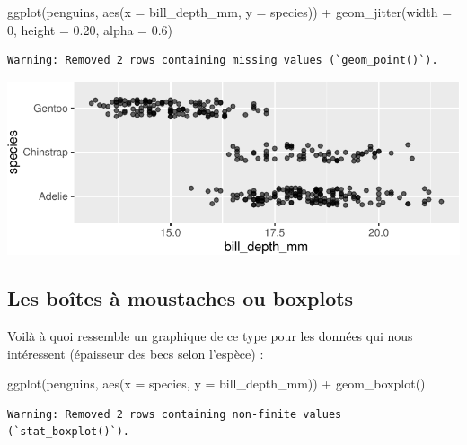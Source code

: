 \documentclass[
  a4paper,
  DIV=11,
  numbers=noendperiod,
  oneside]{scrreprt}
\newenvironment{Shaded}{}{}
\newcommand{\AttributeTok}[1]{\textcolor[rgb]{0.84,0.23,0.29}{#1}}
\newcommand{\DecValTok}[1]{\textcolor[rgb]{0.00,0.36,0.77}{#1}}
\newcommand{\FloatTok}[1]{\textcolor[rgb]{0.00,0.36,0.77}{#1}}
\newcommand{\FunctionTok}[1]{\textcolor[rgb]{0.44,0.26,0.76}{#1}}
\newcommand{\NormalTok}[1]{\textcolor[rgb]{0.14,0.16,0.18}{#1}}
\newcommand{\SpecialCharTok}[1]{\textcolor[rgb]{0.00,0.36,0.77}{#1}}
\begin{document}
\begin{Shaded}
\begin{Highlighting}[]
\FunctionTok{ggplot}\NormalTok{(penguins, }\FunctionTok{aes}\NormalTok{(}\AttributeTok{x =}\NormalTok{ bill\_depth\_mm, }\AttributeTok{y =}\NormalTok{ species)) }\SpecialCharTok{+}
  \FunctionTok{geom\_jitter}\NormalTok{(}\AttributeTok{width =} \DecValTok{0}\NormalTok{, }\AttributeTok{height =} \FloatTok{0.20}\NormalTok{, }\AttributeTok{alpha =} \FloatTok{0.6}\NormalTok{)}
\end{Highlighting}
\end{Shaded}

\begin{verbatim}
Warning: Removed 2 rows containing missing values (`geom_point()`).
\end{verbatim}

\includegraphics{03-visualization_files/figure-pdf/unnamed-chunk-71-1.pdf}

\subsection{Les boîtes à moustaches ou
boxplots}\label{les-bouxeetes-uxe0-moustaches-ou-boxplots}

Voilà à quoi ressemble un graphique de ce type pour les données qui nous
intéressent (épaisseur des becs selon l'espèce) :

\begin{Shaded}
\begin{Highlighting}[]
\FunctionTok{ggplot}\NormalTok{(penguins, }\FunctionTok{aes}\NormalTok{(}\AttributeTok{x =}\NormalTok{ species, }\AttributeTok{y =}\NormalTok{ bill\_depth\_mm)) }\SpecialCharTok{+}
  \FunctionTok{geom\_boxplot}\NormalTok{()}
\end{Highlighting}
\end{Shaded}

\begin{verbatim}
Warning: Removed 2 rows containing non-finite values (`stat_boxplot()`).
\end{verbatim}
\end{document}
